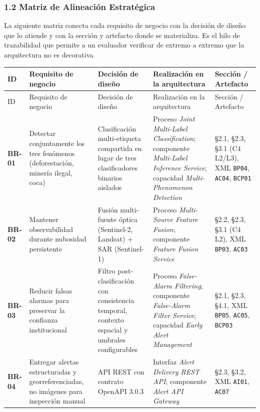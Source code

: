 \documentclass{article}
\begin{document}
\subsubsection{1.2 Matriz de Alineación Estratégica}

La siguiente matriz conecta cada requisito de negocio con la decisión de diseño que lo atiende y con la sección y artefacto donde se materializa. Es el hilo de trazabilidad que permite a un evaluador verificar de extremo a extremo que la arquitectura no es decorativa.

{\footnotesize
\begin{longtable}{@{}L{0.40in}L{1.35in}L{1.56in}L{1.75in}L{0.75in}@{}}
\toprule
ID & Requisito de negocio & Decisión de diseño & Realización en la arquitectura & Sección / Artefacto \\
\midrule
\endfirsthead
\toprule
ID & Requisito de negocio & Decisión de diseño & Realización en la arquitectura & Sección / Artefacto \\
\midrule
\endhead
\bottomrule
\endlastfoot
\textbf{BR-01} & Detectar conjuntamente los tres fenómenos (deforestación, minería ilegal, coca) & Clasificación multi-etiqueta compartida en lugar de tres clasificadores binarios aislados & Proceso \emph{Joint Multi-Label Classification}; componente \emph{Multi-Label Inference Service}; capacidad \emph{Multi-Phenomenon Detection} & \S{}2.1, \S{}2.3, \S{}3.1 (C4 L2/L3), XML \texttt{BP04}, \texttt{AC04}, \texttt{BCP01} \\
\textbf{BR-02} & Mantener observabilidad durante nubosidad persistente & Fusión multi-fuente óptica (Sentinel-2, Landsat) + SAR (Sentinel-1) & Proceso \emph{Multi-Source Feature Fusion}; componente \emph{Feature Fusion Service} & \S{}2.2, \S{}2.3, \S{}3.1 (C4 L2), XML \texttt{BP03}, \texttt{AC03} \\
\textbf{BR-03} & Reducir falsas alarmas para preservar la confianza institucional & Filtro post-clasificación con consistencia temporal, contexto espacial y umbrales configurables & Proceso \emph{False-Alarm Filtering}; componente \emph{False-Alarm Filter Service}; capacidad \emph{Early Alert Management} & \S{}2.1, \S{}2.3, \S{}4.1, XML \texttt{BP05}, \texttt{AC05}, \texttt{BCP03} \\
\textbf{BR-04} & Entregar alertas estructuradas y georreferenciadas, no imágenes para inspección manual & API REST con contrato OpenAPI 3.0.3 & Interfaz \emph{Alert Delivery REST API}; componente \emph{Alert API Gateway} & \S{}2.3, \S{}3.2, XML \texttt{AI01}, \texttt{AC07} \\

\end{longtable}}
\end{document}
